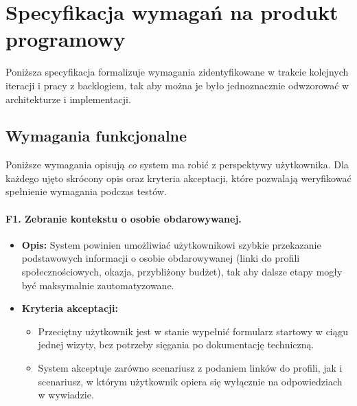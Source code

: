 \documentclass[12pt,a4paper]{article}
\begin{document}
\section{Specyfikacja wymagań na produkt programowy}

Poniższa specyfikacja formalizuje wymagania zidentyfikowane w trakcie kolejnych iteracji i pracy z backlogiem, tak aby można je było jednoznacznie odwzorować w architekturze i implementacji.

\subsection{Wymagania funkcjonalne}
Poniższe wymagania opisują \emph{co} system ma robić z perspektywy użytkownika. Dla każdego ujęto skrócony opis oraz kryteria akceptacji, które pozwalają weryfikować spełnienie wymagania podczas testów.

\paragraph{F1. Zebranie kontekstu o osobie obdarowywanej.}
\begin{itemize}
    \item \textbf{Opis:} System powinien umożliwiać użytkownikowi szybkie przekazanie podstawowych informacji o osobie obdarowywanej (linki do profili społecznościowych, okazja, przybliżony budżet), tak aby dalsze etapy mogły być maksymalnie zautomatyzowane.
    \item \textbf{Kryteria akceptacji:}
    \begin{itemize}
        \item Przeciętny użytkownik jest w stanie wypełnić formularz startowy w ciągu jednej wizyty, bez potrzeby sięgania po dokumentację techniczną.
        \item System akceptuje zarówno scenariusz z podaniem linków do profili, jak i scenariusz, w którym użytkownik opiera się wyłącznie na odpowiedziach w wywiadzie.
    \end{itemize}
\end{itemize}
\end{document}
